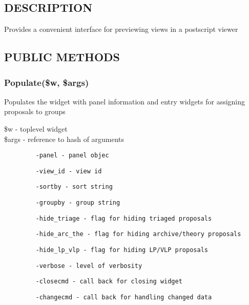 \documentclass{article}
\begin{document}
\subsection*{DESCRIPTION\label{PrintPreview_DESCRIPTION}}


Provides a convenient interface for previewing views in a postscript viewer

\subsection*{PUBLIC METHODS\label{PrintPreview_PUBLIC_METHODS}}
\subsubsection*{Populate(\$w, \$args)\label{PrintPreview_Populate_w_args_}}


Populates the widget with panel information and entry widgets for assigning
proposals to groups

\begin{description}

\item[{\$w - toplevel widget}] \mbox{}
\item[{\$args - reference to hash of arguments}] \mbox{}\begin{verbatim}
   -panel - panel objec
\end{verbatim}
\begin{verbatim}
   -view_id - view id
\end{verbatim}
\begin{verbatim}
   -sortby - sort string
\end{verbatim}
\begin{verbatim}
   -groupby - group string
\end{verbatim}
\begin{verbatim}
   -hide_triage - flag for hiding triaged proposals
\end{verbatim}
\begin{verbatim}
   -hide_arc_the - flag for hiding archive/theory proposals
\end{verbatim}
\begin{verbatim}
   -hide_lp_vlp - flag for hiding LP/VLP proposals
\end{verbatim}
\begin{verbatim}
   -verbose - level of verbosity
\end{verbatim}
\begin{verbatim}
   -closecmd - call back for closing widget
\end{verbatim}
\begin{verbatim}
   -changecmd - call back for handling changed data
\end{verbatim}
\end{description}
\end{document}
